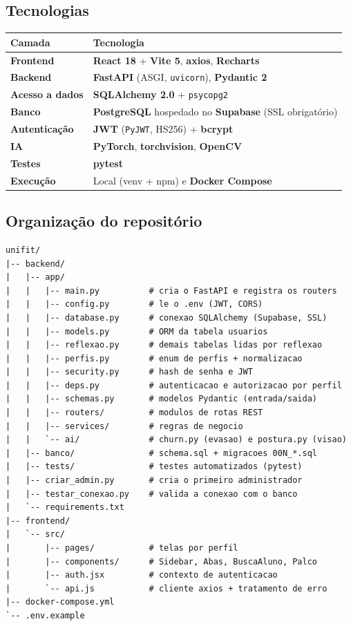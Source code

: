 \documentclass[11pt,a4paper,final]{article}
\newcommand{\cod}[1]{\texttt{#1}}
\begin{document}
\subsection{Tecnologias}

\begin{center}
\begin{tabular}{>{\bfseries}l l}
  \toprule
  Camada & Tecnologia \\
  \midrule
  Frontend             & \textbf{React 18} + \textbf{Vite 5}, \textbf{axios}, \textbf{Recharts} \\
  Backend              & \textbf{FastAPI} (ASGI, \cod{uvicorn}), \textbf{Pydantic 2} \\
  Acesso a dados       & \textbf{SQLAlchemy 2.0} + \cod{psycopg2} \\
  Banco                & \textbf{PostgreSQL} hospedado no \textbf{Supabase} (SSL obrigatório) \\
  Autenticação         & \textbf{JWT} (\cod{PyJWT}, HS256) + \textbf{bcrypt} \\
  IA                   & \textbf{PyTorch}, \textbf{torchvision}, \textbf{OpenCV} \\
  Testes               & \textbf{pytest} \\
  Execução             & Local (venv + npm) e \textbf{Docker Compose} \\
  \bottomrule
\end{tabular}
\end{center}

\subsection{Organização do repositório}

\begin{lstlisting}
unifit/
|-- backend/
|   |-- app/
|   |   |-- main.py          # cria o FastAPI e registra os routers
|   |   |-- config.py        # le o .env (JWT, CORS)
|   |   |-- database.py      # conexao SQLAlchemy (Supabase, SSL)
|   |   |-- models.py        # ORM da tabela usuarios
|   |   |-- reflexao.py      # demais tabelas lidas por reflexao
|   |   |-- perfis.py        # enum de perfis + normalizacao
|   |   |-- security.py      # hash de senha e JWT
|   |   |-- deps.py          # autenticacao e autorizacao por perfil
|   |   |-- schemas.py       # modelos Pydantic (entrada/saida)
|   |   |-- routers/         # modulos de rotas REST
|   |   |-- services/        # regras de negocio
|   |   `-- ai/              # churn.py (evasao) e postura.py (visao)
|   |-- banco/               # schema.sql + migracoes 00N_*.sql
|   |-- tests/               # testes automatizados (pytest)
|   |-- criar_admin.py       # cria o primeiro administrador
|   |-- testar_conexao.py    # valida a conexao com o banco
|   `-- requirements.txt
|-- frontend/
|   `-- src/
|       |-- pages/           # telas por perfil
|       |-- components/      # Sidebar, Abas, BuscaAluno, Palco
|       |-- auth.jsx         # contexto de autenticacao
|       `-- api.js           # cliente axios + tratamento de erro
|-- docker-compose.yml
`-- .env.example
\end{lstlisting}
\end{document}

